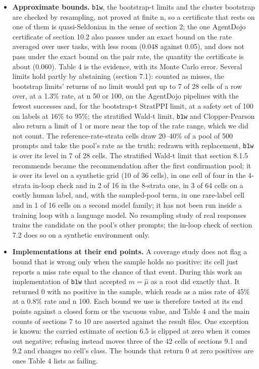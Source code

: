 \documentclass[11pt]{article}
\begin{document}
\begin{itemize}
\item \textbf{Approximate bounds.} \texttt{b1w}, the bootstrap-t limits and the cluster bootstrap are checked by resampling, not proved at finite n, so a certificate that rests on one of them is quasi-Seldonian in the sense of section 2; the one AgentDojo certificate of section 10.2 also passes under an exact bound on the rate averaged over user tasks, with less room (0.048 against 0.05), and does not pass under the exact bound on the pair rate, the quantity the certificate is about (0.060). Table 4 is the evidence, with its Monte Carlo error. Several limits hold partly by abstaining (section 7.1): counted as misses, the bootstrap limits' returns of no limit would put up to 7 of 28 cells of a row over, at a 1.3\% rate, at n 50 or 100, on the AgentDojo pipelines with the fewest successes and, for the bootstrap-t StratPPI limit, at a safety set of 100 on labels at 16\% to 95\%; the stratified Wald-t limit, \texttt{b1w} and Clopper-Pearson also return a limit of 1 or more near the top of the rate range, which we did not count. The reference-rate-strata cells draw 20--40\% of a pool of 500 prompts and take the pool's rate as the truth; redrawn with replacement, \texttt{b1w} is over its level in 7 of 28 cells. The stratified Wald-t limit that section 8.1.5 recommends became the recommendation after the first confirmation pool; it is over its level on a synthetic grid (10 of 36 cells), in one cell of four in the 4-strata in-loop check and in 2 of 16 in the 8-strata one, in 3 of 64 cells on a costly human label, and, with the sampled-pool term, in one rare-label cell and in 1 of 16 cells on a second model family; it has not been run inside a training loop with a language model. No resampling study of real responses trains the candidate on the pool's other prompts; the in-loop check of section 7.2 does so on a synthetic environment only.
\item \textbf{Implementations at their end points.} A coverage study does not flag a bound that is wrong only when the sample holds no positive: its cell just reports a miss rate equal to the chance of that event. During this work an implementation of \texttt{b1w} that accepted $m = \hat{\mu}$ as a root did exactly that. It returned 0 with no positive in the sample, which reads as a miss rate of 45\% at a 0.8\% rate and n 100. Each bound we use is therefore tested at its end points against a closed form or the vacuous value, and Table 4 and the main counts of sections 7 to 10 are asserted against the result files. One exception is known: the carried estimate of section 6.5 is clipped at zero when it comes out negative; refusing instead moves three of the 42 cells of sections 9.1 and 9.2 and changes no cell's class. The bounds that return 0 at zero positives are ones Table 4 lists as failing.

\end{itemize}
\end{document}
